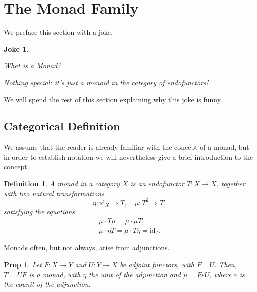 \documentclass[11pt]{article}
\newtheorem{prop}{Prop}
\newtheorem{definition}{Definition}
\newtheorem{joke}{Joke}
\theoremstyle{nonumberplain}
\newcommand{\id}{\mathrm{id}}
\newcommand{\nto}{\Rightarrow}
\begin{document}
\section{The Monad Family}\label{sec:monads}

We preface this section with a joke.

\begin{joke}
\leavevmode
\begin{description}[labelindent=\parindent]
\item[Novice learning Haskell:] What is a Monad?

\item[Haskell expert:] Nothing special: it's just a monoid in the category of endofunctors!
\end{description}
\end{joke}

We will spend the rest of this section explaining why this joke is funny.

\subsection{Categorical Definition}

We assume that the reader is already familiar with the concept of a monad, but in order to establish notation we will nevertheless give a brief introduction to the concept.

\begin{definition}
A monad in a category $X$ is an endofunctor $T \colon X \to X$, together with two natural transformations
\begin{equation}
\eta \colon \id_X \nto T, \quad \mu \colon T^2 \nto T,
\end{equation}
satisfying the equations
\begin{gather}
\mu \cdot T\mu = \mu \cdot \mu T,\\
\mu \cdot \eta T = \mu \cdot T \eta = \id_T.
\end{gather}
\end{definition}

Monads often, but not always, arise from adjunctions.

\begin{prop}
Let $F \colon X \to Y$ and $U \colon Y \to X$ be adjoint functors, with $F \dashv U$. Then, $T = UF$ is a monad, with $\eta$ the unit of the adjunction and $\mu = F \varepsilon U$, where $\varepsilon$ is the counit of the adjunction.
\end{prop}
\end{document}
